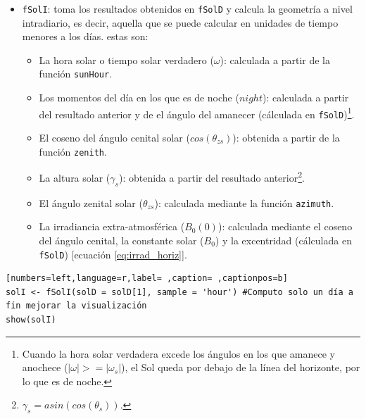 \begin{itemize}
\item \texttt{fSolI}: toma los resultados obtenidos en \texttt{fSolD} y calcula la geometría a nivel intradiario, es decir, aquella que se puede calcular en unidades de tiempo menores a los días.
estas son:
\begin{itemize}
\item La hora solar o tiempo solar verdadero (\(\omega\)): calculada a partir de la función \texttt{sunHour}.
\item Los momentos del día en los que es de noche (\(night\)): calculada a partir del resultado anterior y de el ángulo del amanecer (cálculada en \texttt{fSolD})\footnote{Cuando la hora solar verdadera excede los ángulos en los que amanece y anochece (\(|\omega|>=|\omega_s|\)), el Sol queda por debajo de la línea del horizonte, por lo que es de noche.}.
\item El coseno del ángulo cenital solar (\(cos(\theta_{zs})\)): obtenida a partir de la función \texttt{zenith}.
\item La altura solar (\(\gamma_s\)): obtenida a partir del resultado anterior\footnote{\(\gamma_s=asin(cos(\theta_s))\).}.
\item El ángulo zenital solar (\(\theta_{zs}\)): calculada mediante la función \texttt{azimuth}.
\item La irradiancia extra-atmosférica (\(B_0(0)\)): calculada mediante el coseno del ángulo cenital, la constante solar (\(B_0\)) y la excentridad (cálculada en \texttt{fSolD}) [ecuación \ref{eq:irrad_horiz}].
\end{itemize}
\end{itemize}
\begin{lstlisting}[numbers=left,language=r,label= ,caption= ,captionpos=b]
solI <- fSolI(solD = solD[1], sample = 'hour') #Computo solo un día a fin mejorar la visualización
show(solI)
\end{lstlisting}

